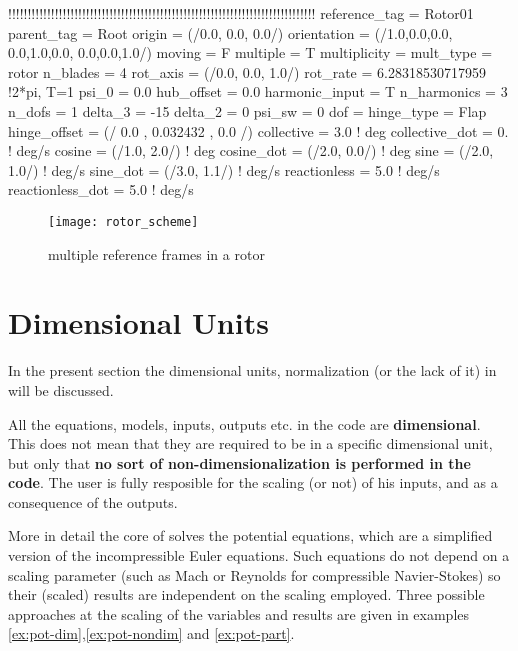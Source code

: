 \begin{inputfile}[frame=single, caption={references\_rotor_mbc.in}, label={file:references_rotor_mbc.in}]
    !!!!!!!!!!!!!!!!!!!!!!!!!!!!!!!!!!!!!!!!!!!!!!!!!!!!!!!!!!!!!!!!!!!!!!!!!!!!!!!
    reference_tag = Rotor01
    parent_tag = Root
    origin = (/0.0, 0.0, 0.0/)
    orientation = (/1.0,0.0,0.0, 0.0,1.0,0.0, 0.0,0.0,1.0/)
    moving = F
    multiple = T
    multiplicity = {
      mult_type = rotor
      n_blades = 4
      rot_axis = (/0.0, 0.0, 1.0/)
      rot_rate = 6.28318530717959 !2*pi, T=1
      psi_0 = 0.0
      hub_offset = 0.0
      harmonic_input = T 
      n_harmonics = 3 
      n_dofs = 1
      delta_3 = -15
      delta_2 = 0
      psi_sw = 0 
      dof = {
        hinge_type = Flap
        hinge_offset = (/ 0.0 , 0.032432 , 0.0 /)
        collective = 3.0            ! deg
        collective_dot = 0.         ! deg/s
        cosine = (/1.0, 2.0/)       ! deg
        cosine_dot = (/2.0, 0.0/)   ! deg
        sine = (/2.0, 1.0/)         ! deg/s
        sine_dot = (/3.0, 1.1/)     ! deg/s
        reactionless = 5.0          ! deg/s
        reactionless_dot = 5.0      ! deg/s
      }
    }
    
    \end{inputfile}
\begin{figure}[htbp]
\centering
\texttt{[image: rotor\_scheme]}
\caption{multiple reference frames in a rotor}
\label{fig:multiple_refs}
\end{figure}

\section{Dimensional Units}
\label{sec:Dimensional_Units}

In the present section the dimensional units, normalization (or the lack of it) 
in \DUST{} will be discussed.

All the equations, models, inputs, outputs etc. in the code are \textbf{dimensional}. 
This does not mean that they are required to be in a specific dimensional unit, 
but only that \textbf{no sort of non-dimensionalization is performed in the code}. 
The user is fully resposible for the scaling (or not) of his inputs, and as a 
consequence of the outputs. 

More in detail the core of \DUST{} solves the potential equations, which are a 
simplified version of the incompressible Euler equations. Such equations do not 
depend on a scaling parameter (such as Mach or Reynolds for compressible Navier-Stokes) 
so their (scaled) results are independent on the scaling employed. Three possible 
approaches at the scaling of the variables and results are given in examples 
\ref{ex:pot-dim},\ref{ex:pot-nondim} and \ref{ex:pot-part}. 

